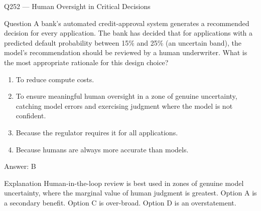 \documentclass[aspectratio=169,8pt]{beamer}
\begin{document}
\begin{frame}{Q252 --- Human Oversight in Critical Decisions}
\begin{block}{Question}
A bank's automated credit-approval system generates a recommended decision for every application. The bank has decided that for applications with a predicted default probability between 15\% and 25\% (an uncertain band), the model's recommendation should be reviewed by a human underwriter. What is the most appropriate rationale for this design choice?
\end{block}
\begin{enumerate}
\item To reduce compute costs.
\item To ensure meaningful human oversight in a zone of genuine uncertainty, catching model errors and exercising judgment where the model is not confident.
\item Because the regulator requires it for all applications.
\item Because humans are always more accurate than models.
\end{enumerate}
\begin{exampleblock}{Answer: B}\end{exampleblock}
\begin{block}{Explanation}
Human-in-the-loop review is best used in zones of genuine model uncertainty, where the marginal value of human judgment is greatest. Option A is a secondary benefit. Option C is over-broad. Option D is an overstatement.
\end{block}
\end{frame}
\end{document}
